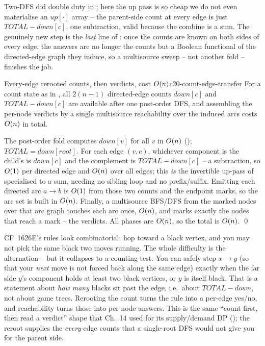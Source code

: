 \noindent Two-DFS did double duty in ; here the up pass is so
cheap we do not even materialise an $\mathit{up}[\cdot]$ array -- the parent-side
count at every edge is just $\mathit{TOTAL}-\mathit{down}[c]$, one subtraction,
valid because the combine is a sum. The genuinely new step is the \emph{last}
line of : once the counts are known on both sides of every
edge, the answers are no longer the counts but a Boolean functional of the
directed-edge graph they induce, so a multisource sweep -- not another fold --
finishes the job.

\begin{theorem}{Every-edge rerooted counts, then verdicts, cost $O(n)$}{c20-count-edge-transfer}
For a count state as in , all $2(n-1)$ directed-edge
counts $\mathit{down}[c]$ and $\mathit{TOTAL}-\mathit{down}[c]$ are available after
one post-order DFS, and assembling the per-node verdicts by a single
multisource reachability over the induced arcs costs $O(n)$ in total.
\end{theorem}

\begin{proofbox}
The post-order fold computes $\mathit{down}[v]$ for all $v$ in $O(n)$
(); $\mathit{TOTAL}=\mathit{down}[\mathit{root}]$.
For each edge $(v,c)$, whichever component is the child's is $\mathit{down}[c]$ and
the complement is $\mathit{TOTAL}-\mathit{down}[c]$ -- a subtraction, so $O(1)$
per directed edge and $O(n)$ over all edges; this \emph{is} the invertible
up-pass of  specialised to a sum, needing no sibling loop
and no prefix/suffix. Emitting each directed arc $a\!\to\!b$ is $O(1)$ from
those two counts and the endpoint marks, so the arc set is built in $O(n)$.
Finally, a multisource BFS/DFS from the marked nodes over that arc graph touches
each arc once, $O(n)$, and marks exactly the nodes that reach a mark -- the
verdicts. All phases are $O(n)$, so the total is $O(n)$. \qed
\end{proofbox}

\begin{insightbox}
CF~1626E's rules look combinatorial: hop toward a black vertex, and you may not
pick the same black two moves running. The whole difficulty is the alternation --
but it collapses to a counting test. You can safely step $x\!\to\!y$ (so that your
\emph{next} move is not forced back along the same edge) exactly when the far
side $y$'s component holds at least two black vertices, or $y$ is itself black.
That is a statement about \emph{how many} blacks sit past the edge, i.e.\ about
$\mathit{TOTAL}-\mathit{down}$, not about game trees. Rerooting the count turns the
rule into a per-edge yes/no, and reachability turns those into per-node answers.
This is the same ``count first, then read a verdict'' shape that Ch.~14 used for
its supply/demand DP (); the reroot supplies the
\emph{every}-edge counts that a single-root DFS would not give you for the
parent side.
\end{insightbox}

